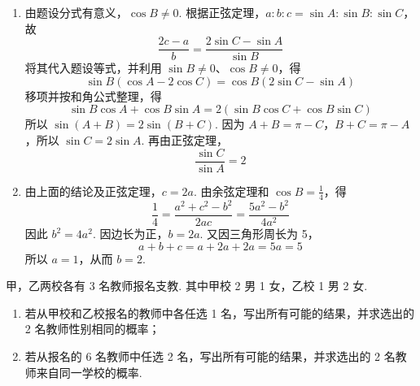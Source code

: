 \begin{solution}
\begin{enumerate}
\item 由题设分式有意义，\(\cos B\neq 0\). 根据正弦定理，\(a:b:c=\sin A:\sin B:\sin C\)，故
\[
\frac{2c-a}{b}=\frac{2\sin C-\sin A}{\sin B}
\]
将其代入题设等式，并利用 \(\sin B\neq 0\)、\(\cos B\neq 0\)，得
\[
\sin B(\cos A-2\cos C)=\cos B(2\sin C-\sin A)
\]
移项并按和角公式整理，得
\[
\sin B\cos A+\cos B\sin A=2(\sin B\cos C+\cos B\sin C)
\]
所以 \(\sin(A+B)=2\sin(B+C)\). 因为 \(A+B=\pi-C\)，\(B+C=\pi-A\)，所以 \(\sin C=2\sin A\). 再由正弦定理，
\[
\frac{\sin C}{\sin A}=2
\]

\item 由上面的结论及正弦定理，\(c=2a\). 由余弦定理和 \(\cos B=\frac14\)，得
\[
\frac14=\frac{a^{2}+c^{2}-b^{2}}{2ac}=\frac{5a^{2}-b^{2}}{4a^{2}}
\]
因此 \(b^{2}=4a^{2}\). 因边长为正，\(b=2a\). 又因三角形周长为 5，
\[
a+b+c=a+2a+2a=5a=5
\]
所以 \(a=1\)，从而 \(b=2\).
\end{enumerate}
\end{solution}

\begin{problem}
甲，乙两校各有 3 名教师报名支教. 其中甲校 2 男 1 女，乙校 1 男 2 女.
\begin{enumerate}
\item 若从甲校和乙校报名的教师中各任选 1 名，写出所有可能的结果，并求选出的 2 名教师性别相同的概率；
\item 若从报名的 6 名教师中任选 2 名，写出所有可能的结果，并求选出的 2 名教师来自同一学校的概率.
\end{enumerate}
\end{problem}


